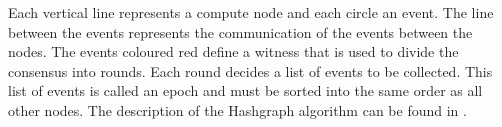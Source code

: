 Each vertical line represents a compute node and each circle an event. The line between the events represents the communication of the events between the nodes. 
The events coloured red define a witness that is used to divide the consensus into rounds. Each round decides a list of events to be collected. This list of events is called an epoch and must be sorted into the same order as all other nodes. The description of the Hashgraph algorithm can be found in \cite{SWIRLDS_HASHGRAPH}.

\pagebreak



\pagebreak


